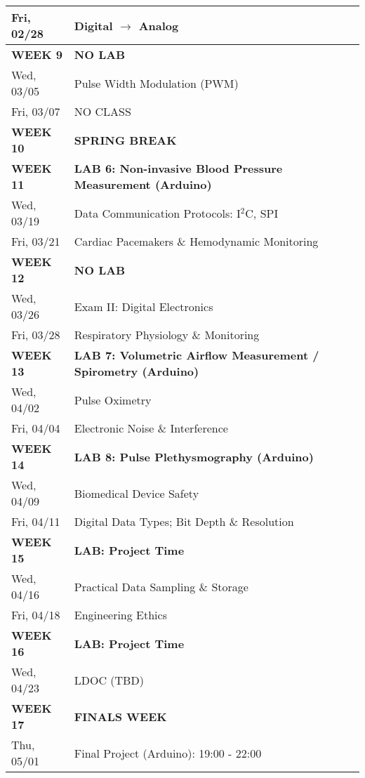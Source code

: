 \begin{tabular}{|l|l|}
Fri, 02/28  &   Digital $\rightarrow$ Analog \\ \hline
{\bf WEEK 9}      &   {\bf NO LAB} \\
Wed, 03/05  &   Pulse Width Modulation (PWM) \\ 
Fri, 03/07  &   NO CLASS \\ \hline
{\bf WEEK 10}     &   {\bf SPRING BREAK} \\ \hline
{\bf WEEK 11}     &   {\bf LAB 6: Non-invasive Blood Pressure Measurement (Arduino)} \\
Wed, 03/19  &   Data Communication Protocols: I$^2$C, SPI\\
Fri, 03/21  &   Cardiac Pacemakers \& Hemodynamic Monitoring \\ \hline
{\bf WEEK 12}     &   {\bf NO LAB} \\
Wed, 03/26  &   Exam II: Digital Electronics \\ 
Fri, 03/28  &   Respiratory Physiology \& Monitoring \\  \hline
{\bf WEEK 13}     &   {\bf LAB 7: Volumetric Airflow Measurement / Spirometry (Arduino)} \\
Wed, 04/02  &   Pulse Oximetry \\ 
Fri, 04/04  &   Electronic Noise \& Interference \\ \hline
{\bf WEEK 14}     &   {\bf LAB 8: Pulse Plethysmography (Arduino)} \\
Wed, 04/09  &   Biomedical Device Safety \\
Fri, 04/11  &   Digital Data Types; Bit Depth \& Resolution \\ \hline
{\bf WEEK 15}     &   {\bf LAB: Project Time} \\
Wed, 04/16  &   Practical Data Sampling \& Storage \\
Fri, 04/18  &   Engineering Ethics \\ \hline
{\bf WEEK 16}     &   {\bf LAB: Project Time} \\
Wed, 04/23  &   LDOC (TBD) \\ \hline
{\bf WEEK 17}     &   {\bf FINALS WEEK} \\
Thu, 05/01  &   Final Project (Arduino): 19:00 - 22:00 \\ \hline
\end{tabular}
